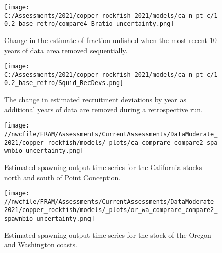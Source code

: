 \documentclass[11pt,
  english,
  a4paper,
]{article}
\begin{document}
\begin{figure}
\centering
\texttt{[image: C:/Assessments/2021/copper\_rockfish\_2021/models/ca\_n\_pt\_c/10.2\_base\_retro/compare4\_Bratio\_uncertainty.png]}
\caption{Change in the estimate of fraction unfished when the most recent 10 years of data area removed sequentially.\label{fig:retro-depl}}
\end{figure}

\tagmcend\tagstructend


\begin{figure}
\centering
\texttt{[image: C:/Assessments/2021/copper\_rockfish\_2021/models/ca\_n\_pt\_c/10.2\_base\_retro/Squid\_RecDevs.png]}
\caption{The change in estimated recruitment deviations by year as additional years of data are removed during a retrospective run.\label{fig:retro-squid}}
\end{figure}

\tagmcend\tagstructend

\newpage


\begin{figure}
\centering
\texttt{[image: //nwcfile/FRAM/Assessments/CurrentAssessments/DataModerate\_2021/copper\_rockfish/models/\_plots/ca\_comprare\_compare2\_spawnbio\_uncertainty.png]}
\caption{Estimated spawning output time series for the California stocks north and south of Point Conception.\label{fig:ssb-ca-compare}}
\end{figure}

\tagmcend\tagstructend


\begin{figure}
\centering
\texttt{[image: //nwcfile/FRAM/Assessments/CurrentAssessments/DataModerate\_2021/copper\_rockfish/models/\_plots/or\_wa\_comprare\_compare2\_spawnbio\_uncertainty.png]}
\caption{Estimated spawning output time series for the stock of the Oregon and Washington coasts.\label{fig:ssb-orwa-compare}}
\end{figure}
\end{document}
